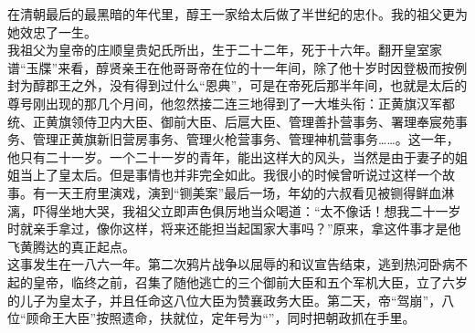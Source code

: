 在清朝最后的最黑暗的年代里，醇王一家给太后做了半世纪的忠仆。我的祖父更为她效忠了一生。\\

我祖父为皇帝的庄顺皇贵妃氏所出，生于二十二年，死于十六年。翻开皇室家谱“玉牒”来看，醇贤亲王在他哥哥帝在位的十一年间，除了他十岁时因登极而按例封为醇郡王之外，没有得到过什么“恩典”，可是在帝死后那半年间，也就是太后的尊号刚出现的那几个月间，他忽然接二连三地得到了一大堆头衔：正黄旗汉军都统、正黄旗领侍卫内大臣、御前大臣、后扈大臣、管理善扑营事务、署理奉宸苑事务、管理正黄旗新旧营房事务、管理火枪营事务、管理神机营事务……。这一年，他只有二十一岁。一个二十一岁的青年，能出这样大的风头，当然是由于妻子的姐姐当上了皇太后。但是事情也并非完全如此。我很小的时候曾听说过这样一个故事。有一天王府里演戏，演到“铡美案”最后一场，年幼的六叔看见被铡得鲜血淋漓，吓得坐地大哭，我祖父立即声色俱厉地当众喝道：“太不像话！想我二十一岁时就亲手拿过，像你这样，将来还能担当起国家大事吗？”原来，拿这件事才是他飞黄腾达的真正起点。\\

这事发生在一八六一年。第二次鸦片战争以屈辱的和议宣告结束，逃到热河卧病不起的皇帝，临终之前，召集了随他逃亡的三个御前大臣和五个军机大臣，立了六岁的儿子为皇太子，并且任命这八位大臣为赞襄政务大臣。第二天，帝“驾崩”，八位“顾命王大臣”按照遗命，扶就位，定年号为“”，同时把朝政抓在手里。\\

